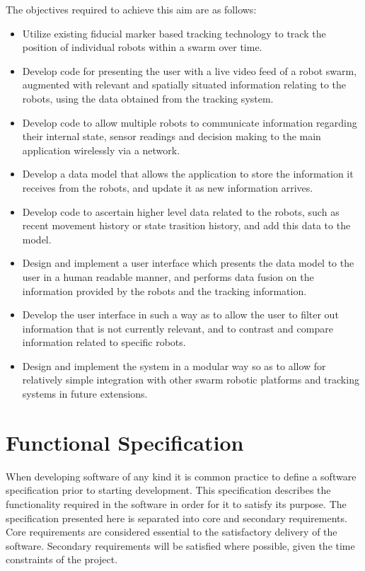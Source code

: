 The objectives required to achieve this aim are as follows:

\begin{itemize}
	\item Utilize existing fiducial marker based tracking technology to track the position of individual robots within a swarm over time.
	\item Develop code for presenting the user with a live video feed of a robot swarm, augmented with relevant and spatially situated information relating to the robots, using the data obtained from the tracking system.
	\item Develop code to allow multiple robots to communicate information regarding their internal state, sensor readings and decision making to the main application wirelessly via a network.
	\item Develop a data model that allows the application to store the information it receives from the robots, and update it as new information arrives.
	\item Develop code to ascertain higher level data related to the robots, such as recent movement history or state trasition history, and add this data to the model.
	\item Design and implement a user interface which presents the data model to the user in a human readable manner, and performs data fusion on the information provided by the robots and the tracking information.
	\item Develop the user interface in such a way as to allow the user to filter out information that is not currently relevant, and to contrast and compare information related to specific robots.
	\item Design and implement the system in a modular way so as to allow for relatively simple integration with other swarm robotic platforms and tracking systems in future extensions.
\end{itemize}


\section{Functional Specification}
When developing software of any kind it is common practice to define a software specification prior to starting development. This specification describes the functionality required in the software in order for it to satisfy its purpose. The specification presented here is separated into core and secondary requirements. Core requirements are considered essential to the satisfactory delivery of the software. Secondary requirements will be satisfied where possible, given the time constraints of the project.

